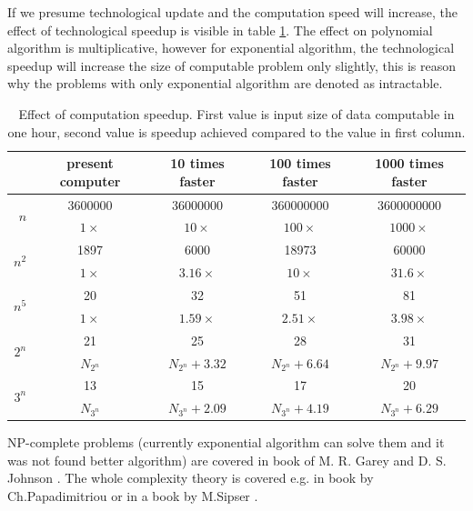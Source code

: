 If we presume technological update and the computation speed will increase, the effect of technological speedup is visible in table \ref{table:speedupeffect}. The effect on polynomial algorithm is multiplicative, however for exponential algorithm, the technological speedup will increase the size of computable problem only slightly, this is reason why the problems with only exponential algorithm are denoted as intractable. 
\begin{table}[ht]
\footnotesize
\begin{tabular}{r|c|c|c|c|}
                      & present computer   & 10 times faster               & 100 times faster               & 1000 times faster \\
\hline
\multirow{2}{*}{$n$}  & 3600000        & 36000000         & 360000000        & 3600000000      \\
                      & $1\times$          & $10\times$   & $100\times$  & $1000\times$ \\
\hline
\multirow{2}{*}{$n^2$}                 & 1897 & 6000             & 18973 & 60000            \\
                      & $1\times$          & $3.16\times$ & $10\times$   & $31.6\times$ \\
\hline
\multirow{2}{*}{$n^5$}                 & 20  & 32     & 51    & 81    \\
                      & $1\times$          & $1.59\times$ & $2.51\times$ & $3.98\times$ \\
\hline
\multirow{2}{*}{$2^n$}                 & 21  & 25    & 28    & 31    \\
                      & $N_{2^n}$       & $N_{2^n}+3.32$    & $N_{2^n}+6.64$    & $N_{2^n}+9.97$    \\
\hline
\multirow{2}{*}{$3^n$} & 13  & 15    & 17    & 20    \\
                      & $N_{3^n}$       & $N_{3^n}+2.09$    & $N_{3^n}+4.19$     & $N_{3^n}+6.29$                  \\
                      \hline
\end{tabular}
\caption{ Effect of computation speedup. First value is input size of data computable in one hour, second value is speedup achieved compared to the value in first column. }
\label{table:speedupeffect}
\end{table}

NP-complete problems (currently exponential algorithm can solve them and it was not found better algorithm) are covered in book of M. R. Garey and D. S. Johnson \cite{Garey1979}. The whole complexity theory is covered e.g. in book by Ch.Papadimitriou \cite{Papadimitriou1995} or in a book by M.Sipser \cite{Sipser2012}. 

